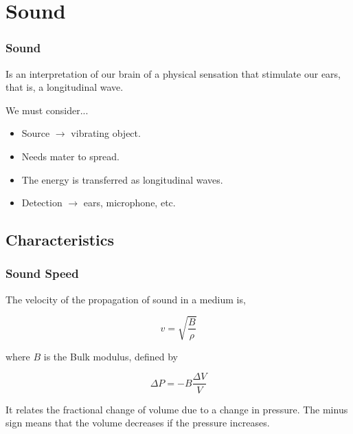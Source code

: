 \documentclass[]{beamer}
\begin{document}
\section{Sound}

\begin{frame}
\frametitle{Sound}

Is an interpretation of our brain of a physical sensation that stimulate our ears, that is, a longitudinal wave.

\pause

\vspace{3mm}

We must consider...

\pause
\begin{itemize}
\item Source $\rightarrow$ vibrating object.

\pause
\item Needs mater to spread.

\pause
\item The energy is transferred as longitudinal waves.

\pause
\item Detection $\rightarrow$ ears, microphone, etc.
\end{itemize}


  \end{frame}


\subsection{Characteristics}

\begin{frame}
\frametitle{Sound Speed}

The velocity of the propagation of sound in a medium is,

\begin{equation}
v=\sqrt{\frac{B}{\rho}}
\end{equation}

where $B$ is the Bulk modulus, defined by

\begin{equation*}
\Delta P=-B\frac{\Delta V}{V}
\end{equation*}

It relates the fractional change of volume due to a change in pressure. The minus sign means that the volume decreases if the pressure increases. 


 



  \end{frame}
\end{document}
